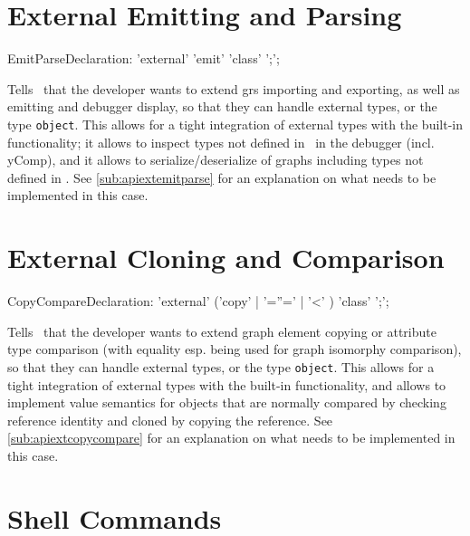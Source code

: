 \section{External Emitting and Parsing}\label{sub:extemitparse}
\begin{rail}
  EmitParseDeclaration: 'external' 'emit' 'class' ';';
\end{rail}
Tells \GrG~that the developer wants to extend grs importing and exporting, as well as emitting and debugger display, so that they can handle external types, or the type \texttt{object}.
This allows for a tight integration of external types with the built-in functionality;
it allows to inspect types not defined in \GrG~in the debugger (incl. yComp),
and it allows to serialize/deserialize of graphs including types not defined in \GrG.
See \ref{sub:apiextemitparse} for an explanation on what needs to be implemented in this case.

\section{External Cloning and Comparison}\label{sub:extcopycompare}
\begin{rail}
  CopyCompareDeclaration: 'external' ('copy' | '=''=' | '<' ) 'class' ';';
\end{rail}
Tells \GrG~that the developer wants to extend graph element copying or attribute type comparison (with equality esp. being used for graph isomorphy comparison), so that they can handle external types, or the type \texttt{object}.
This allows for a tight integration of external types with the built-in functionality, 
and allows to implement value semantics for objects that are normally compared by checking reference identity and cloned by copying the reference.
See \ref{sub:apiextcopycompare} for an explanation on what needs to be implemented in this case.

\section{Shell Commands}

